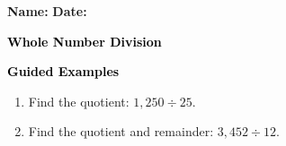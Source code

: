 \documentclass[12pt, letterpaper, fleqn]{article}
\begin{document}
\textbf{Name:} \underline{\hspace{5cm}}
\hfill
\textbf{Date:} \underline{\hspace{3cm}}\\

\begin{tcolorbox}[colback=customteal!20]
    \large\textcolor{black}{\textbf{Whole Number Division}}
\end{tcolorbox}
\newpage
\begin{tcolorbox}[colback=customteal!20]
    \large\textcolor{black}{\textbf{Guided Examples}}
\end{tcolorbox}
\begin{enumerate}[itemsep=3.5cm, leftmargin=0.6cm]
\item Find the quotient: $1,250 \div 25$.
\vspace{3cm}
\item Find the quotient and remainder: $3,452 \div 12$.
\end{enumerate}
\end{document}
